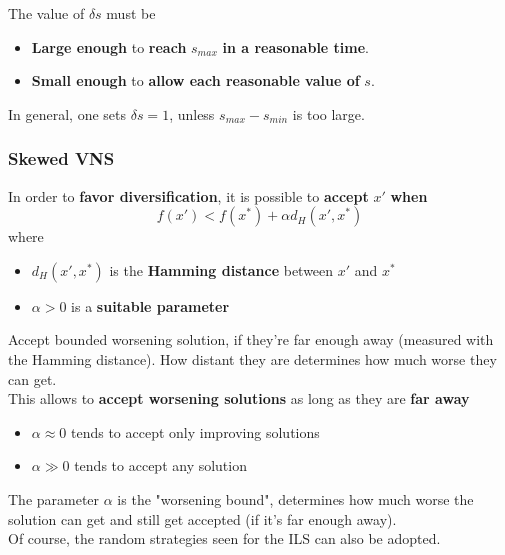 \documentclass[11pt]{article}
\begin{document}
	The value of $\delta s$ must be
	\begin{itemize}
		\item \textbf{Large enough} to \textbf{reach} $s_{max}$ \textbf{in a reasonable time}.\\
		
		\item \textbf{Small enough} to \textbf{allow each reasonable value of} $s$.\\
	\end{itemize}
	
	In general, one sets $\delta s = 1$, unless $s_{max} - s_{min}$ is too large.\\
	
	\newpage
	
	\subsubsection{Skewed VNS}
	In order to \textbf{favor diversification}, it is possible to \textbf{accept} $x'$ \textbf{when}
	$$ f (x') < f (x^\ast) + \alpha d_H (x', x^\ast) $$
	where
	\begin{itemize}
		\item $d_H (x', x^\ast)$ is the \textbf{Hamming distance} between $x'$ and $x^\ast$
		
		\item $\alpha > 0$ is a \textbf{suitable parameter}
	\end{itemize}
	Accept bounded worsening solution, if they're far enough away (measured with the Hamming distance). How distant they are determines how much worse they can get.\\
	
	This allows to \textbf{accept worsening solutions} as long as they are \textbf{far away}
	\begin{itemize}
		\item $\alpha \approx 0$ tends to accept only improving solutions
		
		\item $\alpha \gg 0$ tends to accept any solution
	\end{itemize}
	The parameter $\alpha$ is the "worsening bound", determines how much worse the solution can get and still get accepted (if it's far enough away).\\
	
	Of course, the random strategies seen for the ILS can also be adopted.\\
	
	
\end{document}
